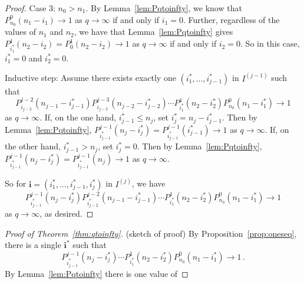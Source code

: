 \begin{proof}
Case 3: $n_0 > n_1$. By Lemma~\ref{lem:Pqtoinfty}, we know that $P_{n_0}^0
(n_1 - i_1) \to 1$ as $q\to\infty$ if and only if $i_1 = 0$. 
Further, regardless of the values of $n_1$ and $n_2$,
we have that Lemma~\ref{lem:Pqtoinfty} gives 
$P_{i_1^\ast}^1(n_2 - i_2) = P_{0}^1(n_2 - i_2)\to 1$ as $q\to\infty$ if and
only if $i_2 = 0$.  So in this case, $i_1^\ast = 0$ and $i_2^\ast = 0$.

Inductive step: Assume there exists exactly one $(i_1^\ast,\ldots , i_{j-1}^\ast)$ in $I^{(j-1)}$ such that 
\[
P_{i_{j-2}}^{j-2}(n_{j-1} - i_{j-1}^\ast)P_{i_{j-3}}^{j-3}(n_{j-2} - i_{j-2}^\ast) \cdots P_{i_1^\ast}^1 (n_2 - i_2^\ast) P_{n_0}^0 (n_1 - i_1^\ast) \to 1
\]
as $q\to\infty$. If, on the one hand, $i_{j-1}^\ast \leq n_j$, set $i_j^\ast =
n_j-i_{j-1}^\ast$.  Then by Lemma~\ref{lem:Pqtoinfty},
$P_{i_{j-1}^\ast}^{j-1}(n_j - i_j^\ast) = P_{i_{j-1}^\ast}^{j-1}(i_{j-1}^\ast)
\to 1$ as $q\to\infty$. If, on the other hand, $i_{j-1}^\ast > n_j$, set
$i_j^\ast = 0$. Then by Lemma~\ref{lem:Pqtoinfty},
$P_{i_{j-1}^\ast}^{j-1}(n_j - i_j^\ast) = P_{i_{j-1}^\ast}^{j-1}(n_j ) \to 1$
as $q \to\infty$.  

So for $\mathbf{i} = (i_1^\ast,\ldots, i_{j-1}^\ast, i_j^\ast)$ in $I^{(j)}$, we have
\[
P_{i_{j-1}^\ast}^{j-1}(n_j-i_j^\ast)P_{i_{j-2}^\ast}^{j-2}(n_{j-1}-i_{j-1}^\ast)\cdots P_{i_1^\ast}^1(n_2-i_2^\ast)P_{n_0}^0(n_1-i_1^\ast) \to 1
\]
as $q\to\infty$, as desired.
\end{proof}

\begin{proof}[Proof of Theorem~\ref{thm:qtoinfty}]
  (sketch of proof) By Proposition~\ref{prop:oneseq}, there is a single $\mathbf{i}^*$
  such that
  \[
    P_{i_{j-1}^\ast}^{j-1}(n_j-i_j^\ast)\cdots
    P_{i_1^\ast}^1(n_2-i_2^\ast)P_{n_0}^0(n_1-i_1^\ast) \to 1 \, .
  \]
  By Lemma~\ref{lem:Pqtoinfty} there is one value of 
\end{proof}

